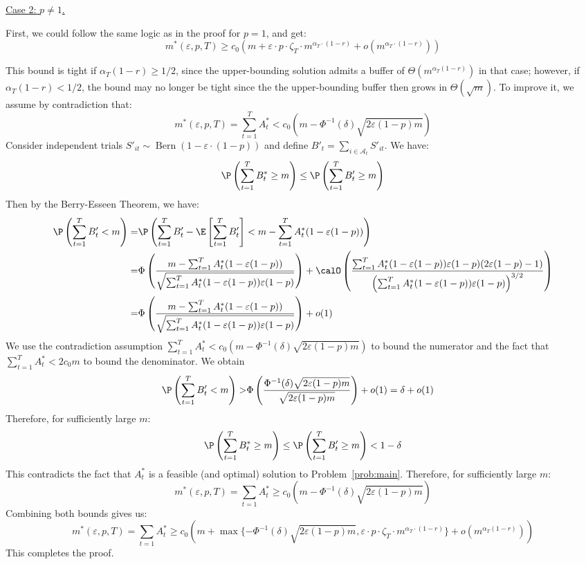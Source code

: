 \documentclass[blindrev]{informs3noheader}
\DeclareMathOperator{\Bern}{Bern}
\begin{document}
\underline{Case 2: $p\neq 1$.}

First, we could follow the same logic as in the proof for $p=1$, and get:
\[m^*(\varepsilon,p,T) \geq c_0\left( m+\varepsilon\cdot p\cdot \zeta_T \cdot m^{\alpha_T\cdot(1-r)} +  o\left(m^{\alpha_T\cdot(1-r)}\right)\right)\]

This bound is tight if $\alpha_T(1-r)\geq1/2$, since the upper-bounding solution admits a buffer of $\Theta(m^{\alpha_T(1-r)})$ in that case; however, if $\alpha_T(1-r)<1/2$, the bound may no longer be tight since the the upper-bounding buffer then grows in $\Theta(\sqrt{m})$. To improve it, we assume by contradiction that:
\[m^*(\varepsilon,p,T)=\sum_{t=1}^T A^*_t <c_0\left(m -\Phi^{-1}(\delta)\sqrt{2\varepsilon(1-p)m}\right)\]
Consider independent trials $S'_{it} \sim \Bern\left(1-\varepsilon\cdot(1-p)\right)$ and define $B'_t = \sum_{i \in \mathcal{A}_t} S'_{it}$. We have:
\[\P\left(\sum_{t=1}^T B^*_t \geq m\right)\leq \P\left(\sum_{t=1}^T B'_t \geq m\right)\]
Then by the Berry-Esseen Theorem, we have:
\begin{align*}
\P\left(\sum_{t=1}^T B'_t<m \right)
=&\P\left(\sum_{t=1}^T B'_t -\E\left[\sum_{t=1}^T B'_t \right] <m-\sum_{t=1}^T A^*_t (1-\varepsilon(1-p)) \right)
\\=&\Phi\left(\frac{m-\sum_{t=1}^T A^*_t (1-\varepsilon(1-p))}{\sqrt{\sum_{t=1}^T A^*_t (1-\varepsilon(1-p))\varepsilon(1-p)}}\right) + \calO\left(\frac{\sum_{t=1}^TA^*_t(1-\varepsilon(1-p))\varepsilon(1-p)(2\varepsilon(1-p)-1)}{\left(\sum_{t=1}^T A^*_t (1-\varepsilon(1-p))\varepsilon(1-p)\right)^{3/2}}\right)
\\=&\Phi\left(\frac{m-\sum_{t=1}^T A^*_t (1-\varepsilon(1-p))}{\sqrt{\sum_{t=1}^T A^*_t (1-\varepsilon(1-p))\varepsilon(1-p)}}\right) + o(1)
\end{align*}
We use the contradiction assumption $\sum_{t=1}^T A^*_t < c_0\left(m -\Phi^{-1}(\delta)\sqrt{2\varepsilon(1-p)m}\right)$ to bound the numerator and the fact that $\sum_{t=1}^T A^*_t<2c_0m$ to bound the denominator. We obtain
\begin{align*}
\P\left(\sum_{t=1}^T B'_t<m \right)> &\Phi\left(\frac{\Phi^{-1}(\delta)\sqrt{2\varepsilon(1-p)m}}{\sqrt{2\varepsilon(1-p)m}}\right) + o(1)   =\delta +o(1)
\end{align*}
Therefore, for sufficiently large $m$:
\[\P\left(\sum_{t=1}^T B^*_t \geq m\right)\leq \P\left(\sum_{t=1}^T B'_t \geq m\right)<1-\delta\]
This contradicts the fact that $A^*_t$ is a feasible (and optimal) solution to Problem~\eqref{prob:main}. Therefore, for sufficiently large $m$:
\[m^*(\varepsilon, p,T)=\sum_{t=1} A_t^* \geq c_0\left(m -\Phi^{-1}(\delta)\sqrt{2\varepsilon(1-p)m}\right)\]
Combining both bounds gives us:
\[m^*(\varepsilon, p,T)=\sum_{t=1} A_t^* \geq c_0\left(m +\max\{-\Phi^{-1}(\delta)\sqrt{2\varepsilon(1-p)m},\varepsilon\cdot p\cdot\zeta_T\cdot m^{\alpha_T\cdot(1-r)}\}+o\left(m^{\alpha_T(1-r)}\right)\right)\]
This completes the proof.
\hfill\Halmos
\end{document}
